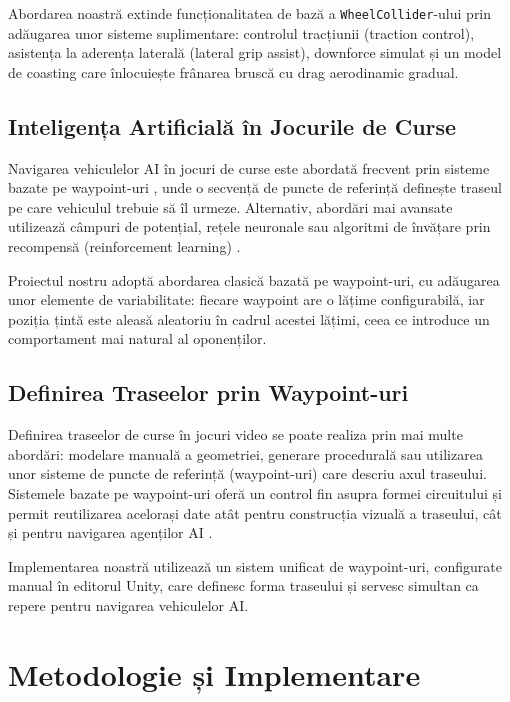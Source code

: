\documentclass[11pt,twocolumn]{article}
\begin{document}
Abordarea noastră extinde funcționalitatea de bază a \texttt{WheelCollider}-ului prin adăugarea unor sisteme suplimentare: controlul tracțiunii (traction control), asistența la aderența laterală (lateral grip assist), downforce simulat și un model de coasting care înlocuiește frânarea bruscă cu drag aerodinamic gradual.

\subsection{Inteligența Artificială în Jocurile de Curse}

Navigarea vehiculelor AI în jocuri de curse este abordată frecvent prin sisteme bazate pe waypoint-uri \cite{rabin2009introduction}, unde o secvență de puncte de referință definește traseul pe care vehiculul trebuie să îl urmeze. Alternativ, abordări mai avansate utilizează câmpuri de potențial, rețele neuronale sau algoritmi de învățare prin recompensă (reinforcement learning) \cite{julian2019deep}.

Proiectul nostru adoptă abordarea clasică bazată pe waypoint-uri, cu adăugarea unor elemente de variabilitate: fiecare waypoint are o lățime configurabilă, iar poziția țintă este aleasă aleatoriu în cadrul acestei lățimi, ceea ce introduce un comportament mai natural al oponenților.

\subsection{Definirea Traseelor prin Waypoint-uri}

Definirea traseelor de curse în jocuri video se poate realiza prin mai multe abordări: modelare manuală a geometriei, generare procedurală \cite{shaker2016procedural} sau utilizarea unor sisteme de puncte de referință (waypoint-uri) care descriu axul traseului. Sistemele bazate pe waypoint-uri oferă un control fin asupra formei circuitului și permit reutilizarea acelorași date atât pentru construcția vizuală a traseului, cât și pentru navigarea agenților AI \cite{rabin2009introduction}.

Implementarea noastră utilizează un sistem unificat de waypoint-uri, configurate manual în editorul Unity, care definesc forma traseului și servesc simultan ca repere pentru navigarea vehiculelor AI.

\section{Metodologie și Implementare}
\label{sec:methodology}
\end{document}
